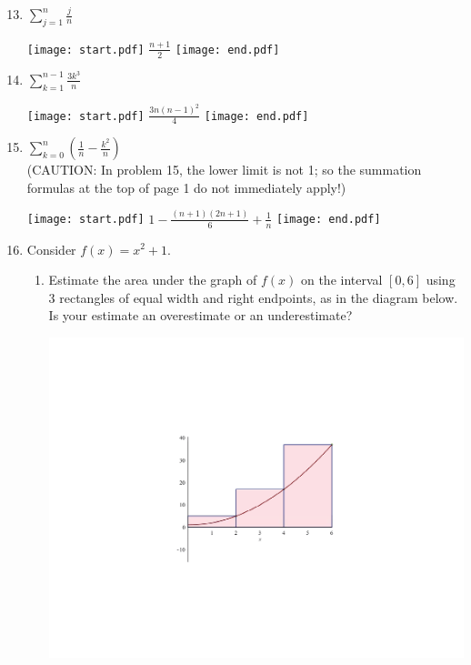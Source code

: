 \documentclass[12pt]{article}
\begin{document}
\begin{enumerate}
\setcounter{enumi}{12}

\item $\sum\limits_{j=1}^{n}\frac{j}{n}$ 

\texttt{[image: start.pdf]}
{{$\frac{n+1}{2}$}}
\texttt{[image: end.pdf]}


\item $\sum\limits_{k=1}^{n-1} \frac{3k^3}{n}$ 

\texttt{[image: start.pdf]}
{{$\frac{3n(n-1)^2}{4}$}}
\texttt{[image: end.pdf]}


\item $\sum\limits_{k=0}^{n} \left(\frac{1}{n}-\frac{k^2}{n}\right)$ \\
(CAUTION: In problem 15, the lower limit is not 1; so the summation formulas at the top of page 1 do not immediately apply!)

\texttt{[image: start.pdf]}
{{$1-\frac{(n+1)(2n+1)}{6}+\frac{1}{n}$}}
\texttt{[image: end.pdf]}


\item Consider $f(x)=x^2+1$.

\begin{enumerate}

\item Estimate the area under the graph of $f(x)$ on the interval $[0,6]$ using 3 rectangles of equal width and right endpoints, as in the diagram below.  Is your estimate an overestimate or an underestimate?

\begin{center}

\includegraphics[scale=0.5]{x2+1right.pdf}


\end{center}
\end{enumerate}
\end{enumerate}
\end{document}
